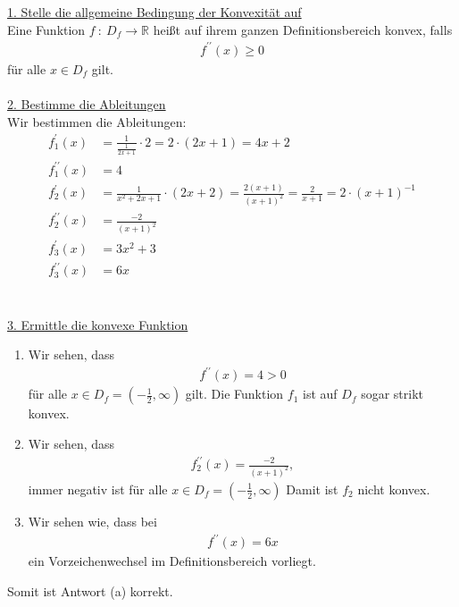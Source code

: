 \underline{1. Stelle die allgemeine Bedingung der Konvexität auf}\\
Eine Funktion $f\ : \ D_f \to \mathbb{R}$ heißt auf ihrem ganzen Definitionsbereich konvex, falls
\begin{align*}
f^{\prime \prime}(x) \geq 0
\end{align*}
für alle $x \in D_f $ gilt.\\
\\
\underline{2. Bestimme die Ableitungen}\\
Wir bestimmen die Ableitungen: 
\begin{align*}
f_1^\prime(x) &= \frac{1}{\frac{1}{2x+1}} \cdot 2
= 2 \cdot(2x+1)
= 4x + 2\\
f_1^{\prime \prime}(x) &= 4\\
f_2^\prime(x) &=\frac{1}{x^2+ 2x +1} \cdot( 2x+2)
= \frac{2(x+1)}{(x+1)^2} = \frac{2}{x+1}
= 2 \cdot (x+1)^{-1}\\
f_2^{\prime \prime}(x)
&=\frac{-2}{(x+1)^2}\\
f_3^\prime(x) &= 3x^2 +3\\
f_3^{\prime \prime}(x) &= 6x 
\end{align*}
\\
\\
\underline{3. Ermittle die konvexe Funktion}
\renewcommand{\labelenumi}{(\alph{enumi})}
\noindent
\begin{enumerate}[leftmargin=0.6cm]
\item Wir sehen, dass
\begin{align*}
f^{\prime \prime}(x) = 4 > 0 
\end{align*}
für alle $x \in D_f= (-\frac{1}{2}, \infty)$ gilt.
Die Funktion $f_1$ ist auf $D_f$ sogar strikt konvex.
\item
Wir sehen, dass
\begin{align*}
f_2^{\prime \prime}(x)=\frac{-2}{(x+1)^2},
\end{align*}
immer negativ ist für alle $x \in D_f = (-\frac{1}{2},\infty)$
Damit ist $f_2$ nicht konvex.

\item
Wir sehen wie, dass bei
\begin{align*}
f^{\prime \prime}(x) = 6x
\end{align*}
ein Vorzeichenwechsel im Definitionsbereich vorliegt.
\end{enumerate}
Somit ist Antwort (a) korrekt.



%
%



